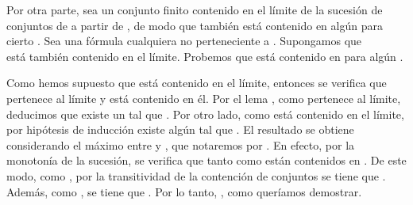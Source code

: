 \begin{isabellebody}
\begin{isamarkuptext}
\begin{demostracion}
  Por otra parte, sea  un conjunto finito contenido en el límite de la sucesión de conjuntos de 
   a partir de , de modo que también está contenido en algún  para cierto . Sea 
   una fórmula cualquiera no perteneciente a . Supongamos que\\  está también 
  contenido en el límite. Probemos que  está contenido en  para algún . 

  Como hemos supuesto que  está contenido en el límite, entonces se verifica que 
  pertenece al límite y  está contenido en él. Por el lema , como  pertenece al 
  límite, deducimos que existe un  tal que . Por otro lado, como  está contenido
  en el límite, por hipótesis de inducción existe algún  tal que . El resultado 
  se obtiene considerando el máximo entre  y , que notaremos por . En efecto, por la 
  monotonía de la sucesión, se verifica que tanto  como  están contenidos en . De este 
  modo, como , por la transitividad de la contención de conjuntos se tiene que 
  . Además, como , se tiene que . Por lo tanto, , como 
  queríamos demostrar. 
\end{demostracion}


\end{isamarkuptext}
\end{isabellebody}
